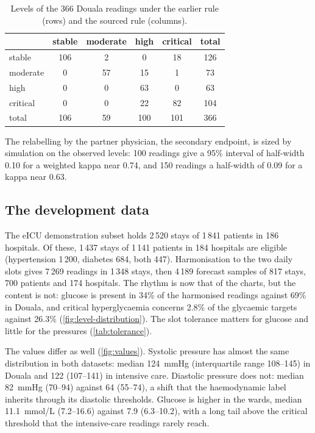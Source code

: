 \begin{table}[htbp]
\centering\footnotesize
\caption{Levels of the 366 Douala readings under the earlier rule (rows) and the sourced rule (columns).}\label{tab:rule-change}
\begin{tabular}{@{}lccccc@{}}
\toprule
 & \textbf{stable} & \textbf{moderate} & \textbf{high} & \textbf{critical} & \textbf{total} \\
\midrule
stable   & 106 & 2  & 0   & 18  & 126 \\
moderate & 0   & 57 & 15  & 1   & 73 \\
high     & 0   & 0  & 63  & 0   & 63 \\
critical & 0   & 0  & 22  & 82  & 104 \\
\midrule
total    & 106 & 59 & 100 & 101 & 366 \\
\bottomrule
\end{tabular}
\end{table}

The relabelling by the partner physician, the secondary endpoint, is sized by simulation on the observed levels: 100 readings give a 95\% interval of half-width 0.10 for a weighted kappa near 0.74, and 150 readings a half-width of 0.09 for a kappa near 0.63.

\subsection{The development data}

The eICU demonstration subset holds 2\,520 stays of 1\,841 patients in 186 hospitals. Of these, 1\,437 stays of 1\,141 patients in 184 hospitals are eligible (hypertension 1\,200, diabetes 684, both 447). Harmonisation to the two daily slots gives 7\,269 readings in 1\,348 stays, then 4\,189 forecast samples of 817 stays, 700 patients and 174 hospitals. The rhythm is now that of the charts, but the content is not: glucose is present in 34\% of the harmonised readings against 69\% in Douala, and critical hyperglycaemia concerns 2.8\% of the glycaemic targets against 26.3\% (\cref{fig:level-distribution}). The slot tolerance matters for glucose and little for the pressures (\cref{tab:tolerance}).

The values differ as well (\cref{fig:values}). Systolic pressure has almost the same distribution in both datasets: median 124~mmHg (interquartile range 108--145) in Douala and 122 (107--141) in intensive care. Diastolic pressure does not: median 82~mmHg (70--94) against 64 (55--74), a shift that the haemodynamic label inherits through its diastolic thresholds. Glucose is higher in the wards, median 11.1~mmol/L (7.2--16.6) against 7.9 (6.3--10.2), with a long tail above the critical threshold that the intensive-care readings rarely reach.

